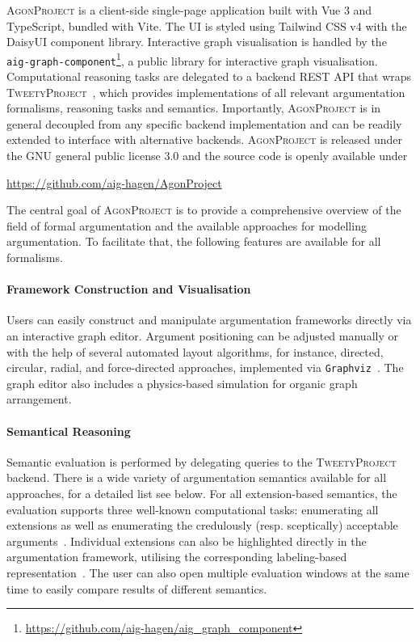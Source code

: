 \documentclass[
]{ceurart}
\newcommand{\agon}{\textsc{AgonProject}\xspace}
\newcommand{\tweety}{\textsc{TweetyProject}\xspace}
\begin{document}
\agon is a client-side single-page application built with Vue 3 and TypeScript, bundled with Vite.
The UI is styled using Tailwind CSS v4 with the DaisyUI component library. 
Interactive graph visualisation is handled by the \texttt{aig-graph-component}\footnote{\url{https://github.com/aig-hagen/aig_graph_component}}, a public library for interactive graph visualisation.
Computational reasoning tasks are delegated to a backend REST API that wraps \tweety~\cite{DBLP:conf/kr/Thimm14,DBLP:journals/ki/Thimm17a}, which provides implementations of all relevant argumentation formalisms, reasoning tasks and semantics.
Importantly, \agon is in general decoupled from any specific backend implementation and can be readily extended to interface with alternative backends.
\agon is released under the GNU general public license 3.0 and the source code is openly available under

\begin{center}
    \url{https://github.com/aig-hagen/AgonProject}
\end{center}


The central goal of \agon is to provide a comprehensive overview of the field of formal argumentation and the available approaches for modelling argumentation.
To facilitate that, the following features are available for all formalisms.

\paragraph{Framework Construction and Visualisation}
Users can easily construct and manipulate argumentation frameworks directly via an interactive graph editor.
Argument positioning can be adjusted manually or with the help of several automated layout algorithms, for instance, directed, circular, radial, and force-directed approaches, implemented via \texttt{Graphviz}~\cite{DBLP:journals/spe/GansnerN00}.
The graph editor also includes a physics-based simulation for organic graph arrangement.

\paragraph{Semantical Reasoning}
Semantic evaluation is performed by delegating queries to the \tweety backend.
There is a wide variety of argumentation semantics available for all approaches, for a detailed list see below.
For all extension-based semantics, the evaluation supports three well-known computational tasks: enumerating all extensions as well as enumerating the credulously (resp. sceptically) acceptable arguments~\cite{DBLP:books/hofa/DvorakD17}.
Individual extensions can also be highlighted directly in the argumentation framework, utilising the corresponding labeling-based representation~\cite{DBLP:journals/sLogica/CaminadaG09}.
The user can also open multiple evaluation windows at the same time to easily compare results of different semantics.
\end{document}
